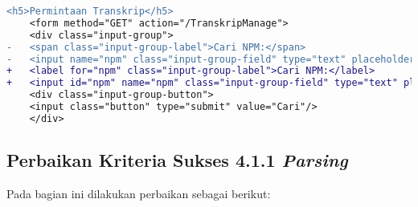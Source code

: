 \begin{lstlisting}[frame=single, label={lst:perbaikan_3.3.2_label_masukan}, language=diff, caption=Perbaikan Kriteria Sukses 3.3.2 - Tidak Terdapat Label pada Kolom Masukan]
    <h5>Permintaan Transkrip</h5>
    <form method="GET" action="/TranskripManage">
    <div class="input-group">
-   <span class="input-group-label">Cari NPM:</span>
-   <input name="npm" class="input-group-field" type="text" placeholder="2013730013" maxlength="10" minlength="10"<?= $npmQuery === NULL ? '' : " value='$npmQuery'" ?>/>
+   <label for="npm" class="input-group-label">Cari NPM:</label>
+   <input id="npm" name="npm" class="input-group-field" type="text" placeholder="2013730013" maxlength="10" minlength="10"<?= $npmQuery === NULL ? '' : " value='$npmQuery'" ?>/>
    <div class="input-group-button">
    <input class="button" type="submit" value="Cari"/>
    </div>
\end{lstlisting} 

\subsection{Perbaikan Kriteria Sukses 4.1.1 \textit{Parsing}}
\label{subsec:perbaikan_kriteria_sukses_4.1.1}
Pada bagian ini dilakukan perbaikan sebagai berikut:

